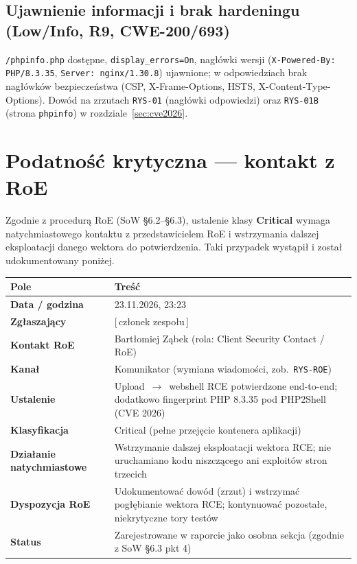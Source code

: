 \documentclass[11pt,a4paper]{article}
\begin{document}
\subsection{Ujawnienie informacji i brak hardeningu (Low/Info, R9, CWE-200/693)}
\texttt{/phpinfo.php} dostępne, \texttt{display\_errors=On}, nagłówki wersji
(\texttt{X-Powered-By: PHP/8.3.35}, \texttt{Server: nginx/1.30.8}) ujawnione; w odpowiedziach brak
nagłówków bezpieczeństwa (CSP, X-Frame-Options, HSTS, X-Content-Type-Options). Dowód na zrzutach
\texttt{RYS-01} (nagłówki odpowiedzi) oraz \texttt{RYS-01B} (strona \texttt{phpinfo}) w
rozdziale~\ref{sec:cve2026}.

\section{Podatność krytyczna --- kontakt z RoE}
\label{sec:roe}

Zgodnie z procedurą RoE (SoW §6.2--§6.3), ustalenie klasy \textbf{Critical} wymaga natychmiastowego
kontaktu z przedstawicielem RoE i wstrzymania dalszej eksploatacji danego wektora do potwierdzenia.
Taki przypadek wystąpił i został udokumentowany poniżej.

\begin{center}
\begin{tabularx}{\textwidth}{@{}>{\bfseries}p{3.2cm} L@{}}
\toprule
\normalfont\textbf{Pole} & \textbf{Treść} \\
\midrule
Data / godzina & 23.11.2026, 23:23 \\
Zgłaszający & [\,członek zespołu\,] \\
Kontakt RoE & Bartłomiej Ząbek (rola: Client Security Contact / RoE) \\
Kanał & Komunikator (wymiana wiadomości, zob.~\texttt{RYS-ROE}) \\
Ustalenie & Upload~$\rightarrow$~webshell RCE potwierdzone end-to-end; dodatkowo fingerprint PHP 8.3.35 pod PHP2Shell (CVE 2026) \\
Klasyfikacja & Critical (pełne przejęcie kontenera aplikacji) \\
Działanie natychmiastowe & Wstrzymanie dalszej eksploatacji wektora RCE; nie uruchamiano kodu niszczącego ani exploitów stron trzecich \\
Dyspozycja RoE & Udokumentować dowód (zrzut) i wstrzymać pogłębianie wektora RCE; kontynuować pozostałe, niekrytyczne tory testów \\
Status & Zarejestrowane w raporcie jako osobna sekcja (zgodnie z SoW §6.3 pkt 4) \\
\bottomrule
\end{tabularx}
\end{center}
\end{document}
